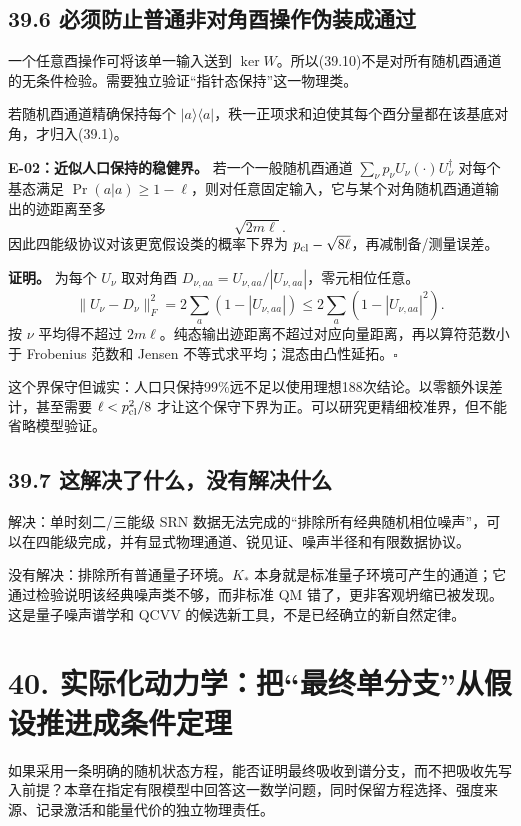 \documentclass[
  11pt,
  oneside]{book}
\begin{document}
\section{39.6 必须防止普通非对角酉操作伪装成通过}

一个任意酉操作可将该单一输入送到
\(\ker W\)。所以(39.10)不是对所有随机酉通道的无条件检验。需要独立验证``指针态保持''这一物理类。

若随机酉通道精确保持每个
\(|a\rangle\langle a|\)，秩一正项求和迫使其每个酉分量都在该基底对角，才归入(39.1)。

\protect\hypertarget{e-02}{}{}

\textbf{E-02：近似人口保持的稳健界。} 若一个一般随机酉通道
\(\sum_\nu p_\nu U_\nu(\cdot)U_\nu^\dagger\) 对每个基态满足
\(\Pr(a|a)\ge1-\ell\)，则对任意固定输入，它与某个对角随机酉通道输出的迹距离至多
\[
\sqrt{2m\ell}.
\tag{39.12}
\] 因此四能级协议对该更宽假设类的概率下界为
\(p_{\rm cl}-\sqrt{8\ell}\)，再减制备/测量误差。

\textbf{证明。} 为每个 \(U_\nu\) 取对角酉
\(D_{\nu,aa}=U_{\nu,aa}/|U_{\nu,aa}|\)，零元相位任意。 \[
\|U_\nu-D_\nu\|_F^2=2\sum_a(1-|U_{\nu,aa}|)
\le2\sum_a(1-|U_{\nu,aa}|^2).
\] 按 \(\nu\) 平均得不超过
\(2m\ell\)。纯态输出迹距离不超过对应向量距离，再以算符范数小于 Frobenius
范数和 Jensen 不等式求平均；混态由凸性延拓。\(\square\)

这个界保守但诚实：人口只保持99\%远不足以使用理想188次结论。以零额外误差计，甚至需要
\(\ell<p_{\rm cl}^2/8\)
才让这个保守下界为正。可以研究更精细校准界，但不能省略模型验证。

\section{39.7 这解决了什么，没有解决什么}

解决：单时刻二/三能级 SRN
数据无法完成的``排除所有经典随机相位噪声''，可以在四能级完成，并有显式物理通道、锐见证、噪声半径和有限数据协议。

没有解决：排除所有普通量子环境。\(K_*\)
本身就是标准量子环境可产生的通道；它通过检验说明该经典噪声类不够，而非标准
QM 错了，更非客观坍缩已被发现。这是量子噪声谱学和 QCVV
的候选新工具，不是已经确立的新自然定律。

\chapter{40.
实际化动力学：把``最终单分支''从假设推进成条件定理}\label{ch-40}\hypertarget{ch-40}{}

如果采用一条明确的随机状态方程，能否证明最终吸收到谱分支，而不把吸收先写入前提？本章在指定有限模型中回答这一数学问题，同时保留方程选择、强度来源、记录激活和能量代价的独立物理责任。
\end{document}

